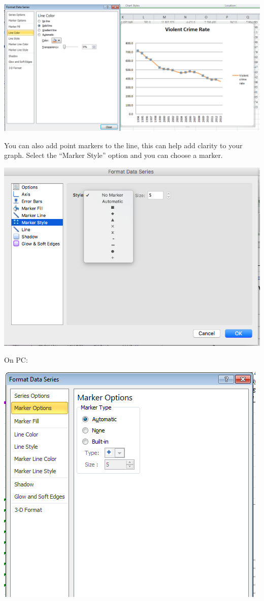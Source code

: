 \documentclass[
]{book}
\begin{document}
\includegraphics{imgs/pc_edit_line.png}

You can also add point markers to the line, this can help add clarity to your graph. Select the ``Marker Style'' option and you can choose a marker.

\includegraphics{imgs/desc_line_markers.png}

On PC:

\includegraphics{imgs/pc_line_1.png}
\end{document}
